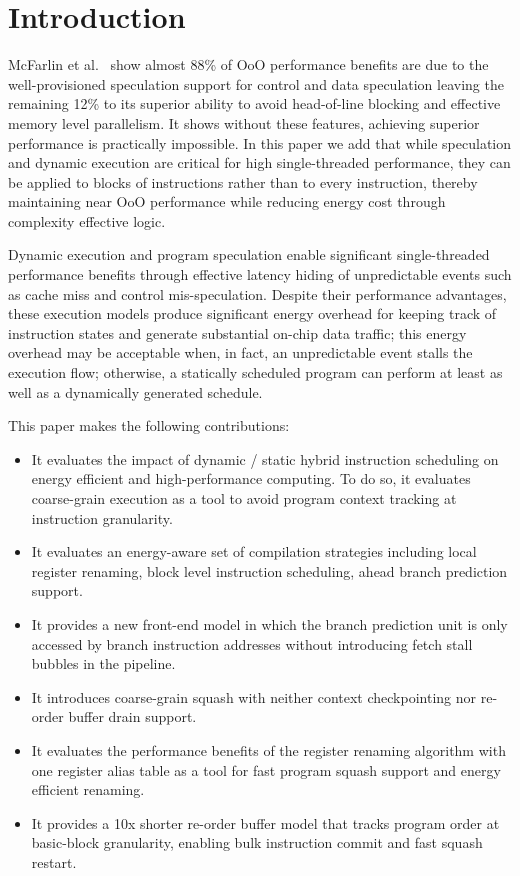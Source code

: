 \section{Introduction} 
\label{sec:intro}

McFarlin et al.~\cite{dyn_specul} show almost 88\% of OoO performance benefits
are due to the well-provisioned speculation support for control and data
speculation leaving the remaining 12\% to its superior ability to avoid
head-of-line blocking and effective memory level parallelism. It shows without
these features, achieving superior performance is practically impossible. In
this paper we add that while speculation and dynamic execution are critical for
high single-threaded performance, they can be applied to blocks of instructions
rather than to every instruction, thereby maintaining near OoO performance while
reducing energy cost through complexity effective logic.

Dynamic execution and program speculation enable significant single-threaded
performance benefits through effective latency hiding of unpredictable events
such as cache miss and control mis-speculation.  Despite their performance
advantages, these execution models produce significant energy overhead for
keeping track of instruction states and generate substantial on-chip data
traffic; this energy overhead may be acceptable when, in fact, an unpredictable
event stalls the execution flow; otherwise, a statically scheduled program can
perform at least as well as a dynamically generated schedule.

This paper makes the following contributions:
\begin{itemize}
    \item It evaluates the impact of dynamic / static hybrid instruction
    scheduling on energy efficient and high-performance computing. To do so, it
    evaluates coarse-grain execution as a tool to avoid program context tracking
    at instruction granularity.
    \item It evaluates an energy-aware set of compilation strategies including
    local register renaming, block level instruction scheduling, ahead branch
    prediction support.
    \item It provides a new front-end model in which the branch prediction unit
    is only accessed by branch instruction addresses without introducing fetch
    stall bubbles in the pipeline.
    \item It introduces coarse-grain squash with neither context checkpointing
    nor re-order buffer drain support.
    \item It evaluates the performance benefits of the register renaming
    algorithm with one register alias table as a tool for fast program squash
    support and energy efficient renaming.
    \item It provides a 10x shorter re-order buffer model that tracks program
    order at basic-block granularity, enabling bulk instruction commit and fast
    squash restart.
\end{itemize}

